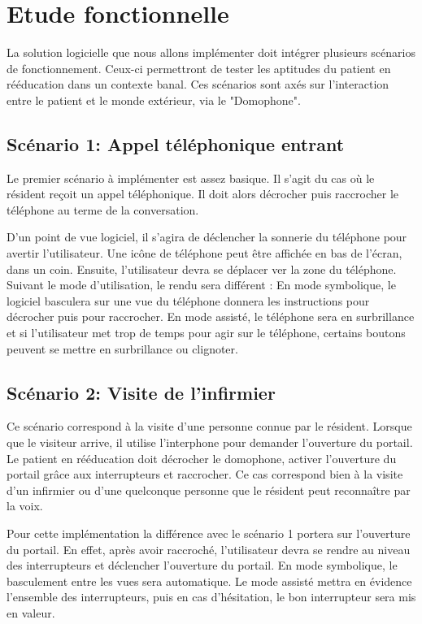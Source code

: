 

\section{Etude fonctionnelle}

La solution logicielle que nous allons implémenter doit intégrer plusieurs scénarios de fonctionnement. Ceux-ci permettront de tester les aptitudes du patient en rééducation dans un contexte banal. Ces scénarios sont axés sur l'interaction entre le patient et le monde extérieur, via le "Domophone". 

\subsection{Scénario 1: Appel téléphonique entrant}

Le premier scénario à implémenter est assez basique. Il s'agit du cas où le résident reçoit un appel téléphonique. Il doit alors décrocher puis raccrocher le téléphone au terme de la conversation.

D'un point de vue logiciel, il s'agira de déclencher la sonnerie du téléphone pour avertir l'utilisateur. Une icône de téléphone peut être affichée en bas de l'écran, dans un coin. Ensuite, l'utilisateur devra se déplacer ver la zone du téléphone. Suivant le mode d'utilisation, le rendu sera différent : En mode symbolique, le logiciel basculera sur une vue du téléphone donnera les instructions pour décrocher puis pour raccrocher. En mode assisté, le téléphone sera en surbrillance et si l'utilisateur met trop de temps pour agir sur le téléphone, certains boutons peuvent se mettre en surbrillance ou clignoter.

\subsection{Scénario 2: Visite de l'infirmier}

Ce scénario correspond à la visite d'une personne connue par le résident. Lorsque que le visiteur arrive, il utilise l'interphone pour demander l'ouverture du portail. Le patient en rééducation doit décrocher le domophone, activer l'ouverture du portail grâce aux interrupteurs et raccrocher. Ce cas correspond bien à la visite d'un infirmier ou d'une quelconque personne que le résident peut reconnaître par la voix. 

Pour cette implémentation la différence avec le scénario 1 portera sur l'ouverture du portail. En effet, après avoir raccroché, l'utilisateur devra se rendre au niveau des interrupteurs et déclencher l'ouverture du portail. En mode symbolique, le basculement entre les vues sera automatique. Le mode assisté mettra en évidence l'ensemble des interrupteurs, puis en cas d'hésitation, le bon interrupteur sera mis en valeur.

